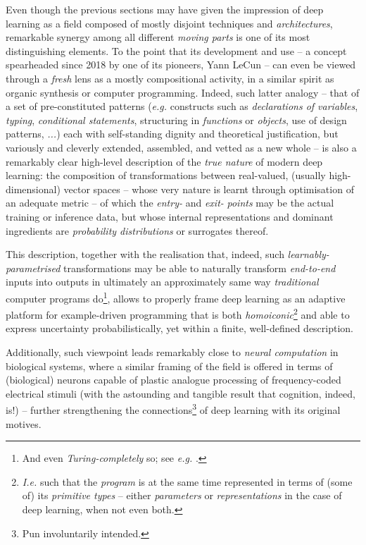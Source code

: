 Even though the previous sections may have given the impression of deep learning as a field composed of mostly disjoint techniques and \textit{architectures}, remarkable synergy among all different \textit{moving parts} is one of its most distinguishing elements. To the point that its development and use -- a concept spearheaded since 2018 by one of its pioneers, Yann LeCun -- can even be viewed through a \textit{fresh} lens as a mostly compositional activity, in a similar spirit as organic synthesis or computer programming. Indeed, such latter analogy -- that of a set of pre-constituted patterns (\textit{e.g.} constructs such as \textit{declarations of variables}, \textit{typing}, \textit{conditional statements}, structuring in \textit{functions} or \textit{objects}, use of design patterns, \textit{...}) each with self-standing dignity and theoretical justification, but variously and cleverly extended, assembled, and vetted as a new whole -- is also a remarkably clear high-level description of the \textit{true nature} of modern deep learning: the composition of transformations between real-valued, (usually high-dimensional) vector spaces -- whose very nature is learnt through optimisation of an adequate metric -- of which the \textit{entry-} and \textit{exit-} \textit{points} may be the actual training or inference data, but whose internal representations and dominant ingredients are \textit{probability distributions} or surrogates thereof.

This description, together with the realisation that, indeed, such \textit{learnably-parametrised} transformations may be able to naturally transform \textit{end-to-end} inputs into outputs in ultimately an approximately same way \textit{traditional} computer programs do\footnote{And even \textit{Turing-completely} so; see \textit{e.g.} \cite{PerezEtAl2018Turing}.}, allows to properly frame deep learning as an adaptive platform for example-driven programming that is both \textit{homoiconic}\footnote{\textit{I.e.} such that the \textit{program} is at the same time represented in terms of (some of) its \textit{primitive types} -- either \textit{parameters} or \textit{representations} in the case of deep learning, when not even both.} and able to express uncertainty probabilistically, yet within a finite, well-defined description.

Additionally, such viewpoint leads remarkably close to \textit{neural computation} in biological systems, where a similar framing of the field is offered in terms of (biological) neurons capable of plastic analogue processing of frequency-coded electrical stimuli (with the astounding and tangible result that cognition, indeed, is!) -- further strengthening the connections\footnote{Pun involuntarily intended.} of deep learning with its original motives.


